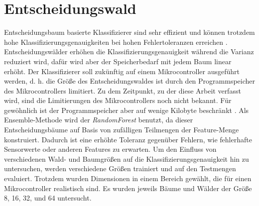 \section{Entscheidungswald}
\label{sec:model_dt}
Entscheidungsbaum basierte Klassifizierer sind sehr effizient und können trotzdem hohe Klassifizierungsgenauigkeiten bei hohen Fehlertoleranzen erreichen \cite{dymelThesis}.
Entscheidungswälder erhöhen die Klassifizierungsgenauigkeit während die Varianz reduziert wird, dafür wird aber der Speicherbedarf mit jedem Baum linear erhöht.
Der Klassifizierer soll zukünftig auf einem Mikrocontroller ausgeführt werden, d. h. die Größe des Entscheidungswaldes ist durch den Programmspeicher des Mikrocontrollers limitiert.
Zu dem Zeitpunkt, zu der diese Arbeit verfasst wird, sind die Limitierungen des Mikrocontrollers noch nicht bekannt.
Für gewöhnlich ist der Programmspeicher aber auf wenige Kilobyte beschränkt \cite{dymelThesis}.
\newline
\newline
Als Ensemble-Methode wird der \textit{RandomForest} benutzt, da dieser Entscheidungsbäume auf Basis von zufälligen Teilmengen der Feature-Menge konstruiert.
Dadurch ist eine erhöhte Toleranz gegenüber Fehlern, wie fehlerhafte Sensorwerte oder anderen Features zu erwarten.
\newline
\newline
Um den Einfluss von verschiedenen Wald- und Baumgrößen auf die Klassifizierungsgenauigkeit hin zu untersuchen, werden verschiedene Größen
trainiert und auf den Testmengen evaluiert. Trotzdem wurden Dimensionen in einem Bereich gewählt, die für einen Mikrocontroller realistisch sind.
Es wurden jeweils Bäume und Wälder der Größe 8, 16, 32, und 64 untersucht.